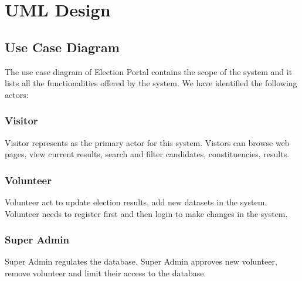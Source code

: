\documentclass[12pt, a4paper, titlepage]{article}
\begin{document}
\section{UML Design}
\subsection{Use Case Diagram}
The use case diagram of Election Portal contains the scope of the system and it lists all the functionalities offered by the system. We have identified the following actors:

\subsubsection{Visitor}
Visitor represents as the primary actor for this system. Vistors can browse web pages, view current results, search and filter candidates, constituencies, results.

\subsubsection{Volunteer} 
Volunteer act to update election results, add new datasets in the system. Volunteer needs to register first and then login to make changes in the system.

\subsubsection{Super Admin}
Super Admin regulates the database. Super Admin approves new volunteer, remove volunteer and limit their access to the database.
\end{document}
